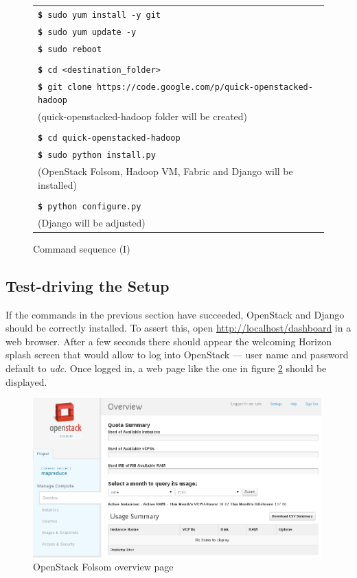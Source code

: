 \begin{figure}[tbp]
 \begin{center}
  \begin{tabular}{|l|}
   \hline
   \texttt{{\bf \$} sudo yum install -y git} \\
   \texttt{{\bf \$} sudo yum update -y} \\
   \texttt{{\bf \$} sudo reboot} \\ \\
   \texttt{{\bf \$} cd <destination\_folder>} \\
   \texttt{{\bf \$} git clone https://code.google.com/p/quick-openstacked-hadoop} \\
   (quick-openstacked-hadoop folder will be created) \\ \\
   \texttt{{\bf \$} cd quick-openstacked-hadoop} \\
   \texttt{{\bf \$} sudo python install.py} \\
   (OpenStack Folsom, Hadoop VM, Fabric and Django will be installed) \\ \\
   \texttt{{\bf \$} python configure.py} \\
   (Django will be adjusted) \\
   \hline
  \end{tabular}
  \caption{Command sequence (I)}
  \label{fig:comandosshell}
 \end{center}
\end{figure}

\subsection{Test-driving the Setup}\label{subsec:testejecucion}
\noindent If the commands in the previous section have succeeded, OpenStack and Django should be correctly installed. To assert this, open \url{http://localhost/dashboard} in a web browser. After a few seconds there should appear the welcoming Horizon splash screen that would allow to log into OpenStack --- user name and password default to \emph{udc}. Once logged in, a web page like the one in figure \ref{fig:homeos} should be displayed.

\begin{figure}[tbp]
\begin{center}
\includegraphics[width=0.99\textwidth]{imagenes/045.png}
\caption{OpenStack Folsom overview page}
\label{fig:homeos}
\end{center}
\end{figure}

